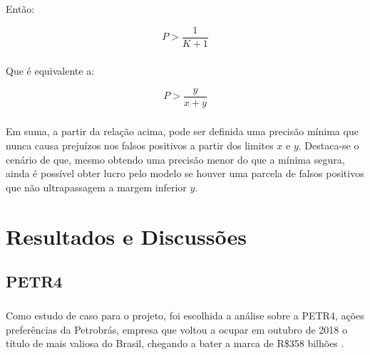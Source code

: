 \documentclass[grad,numbers]{coppe}
\begin{document}
                \paragraph{}Então:
                
                \begin{equation}
                    P > \frac{1}{K + 1}
                \end{equation}
                
                \paragraph{}Que é equivalente a:
                
                \begin{equation}\label{eq:precisao-minima}
                    P > \frac{y}{x + y}
                \end{equation}
                
                \paragraph{}Em suma, a partir da relação acima, pode ser definida uma precisão mínima que nunca causa prejuízos nos falsos positivos a partir dos limites $x$ e $y$. Destaca-se o cenário de que, mesmo obtendo uma precisão menor do que a mínima segura, ainda é possível obter lucro pelo modelo se houver uma parcela de falsos positivos que não ultrapassagem a margem inferior $y$.
                
                
                
    \chapter{Resultados e Discussões}
    
        \section{PETR4}
    
            \paragraph{}Como estudo de caso para o projeto, foi escolhida a análise sobre a PETR4, ações preferências da Petrobrás, empresa que voltou a ocupar em outubro de 2018 o título de mais valiosa do Brasil, chegando a bater a marca de R\$358 bilhões \cite{petr4-intro}. 
            
\end{document}
